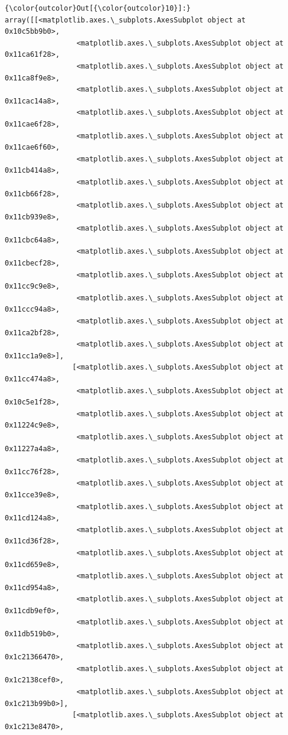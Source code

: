 \documentclass[11pt]{article}
\begin{document}
\begin{Verbatim}[commandchars=\\\{\}]
{\color{outcolor}Out[{\color{outcolor}10}]:} array([[<matplotlib.axes.\_subplots.AxesSubplot object at 0x10c5bb9b0>,
                 <matplotlib.axes.\_subplots.AxesSubplot object at 0x11ca61f28>,
                 <matplotlib.axes.\_subplots.AxesSubplot object at 0x11ca8f9e8>,
                 <matplotlib.axes.\_subplots.AxesSubplot object at 0x11cac14a8>,
                 <matplotlib.axes.\_subplots.AxesSubplot object at 0x11cae6f28>,
                 <matplotlib.axes.\_subplots.AxesSubplot object at 0x11cae6f60>,
                 <matplotlib.axes.\_subplots.AxesSubplot object at 0x11cb414a8>,
                 <matplotlib.axes.\_subplots.AxesSubplot object at 0x11cb66f28>,
                 <matplotlib.axes.\_subplots.AxesSubplot object at 0x11cb939e8>,
                 <matplotlib.axes.\_subplots.AxesSubplot object at 0x11cbc64a8>,
                 <matplotlib.axes.\_subplots.AxesSubplot object at 0x11cbecf28>,
                 <matplotlib.axes.\_subplots.AxesSubplot object at 0x11cc9c9e8>,
                 <matplotlib.axes.\_subplots.AxesSubplot object at 0x11ccc94a8>,
                 <matplotlib.axes.\_subplots.AxesSubplot object at 0x11ca2bf28>,
                 <matplotlib.axes.\_subplots.AxesSubplot object at 0x11cc1a9e8>],
                [<matplotlib.axes.\_subplots.AxesSubplot object at 0x11cc474a8>,
                 <matplotlib.axes.\_subplots.AxesSubplot object at 0x10c5e1f28>,
                 <matplotlib.axes.\_subplots.AxesSubplot object at 0x11224c9e8>,
                 <matplotlib.axes.\_subplots.AxesSubplot object at 0x11227a4a8>,
                 <matplotlib.axes.\_subplots.AxesSubplot object at 0x11cc76f28>,
                 <matplotlib.axes.\_subplots.AxesSubplot object at 0x11cce39e8>,
                 <matplotlib.axes.\_subplots.AxesSubplot object at 0x11cd124a8>,
                 <matplotlib.axes.\_subplots.AxesSubplot object at 0x11cd36f28>,
                 <matplotlib.axes.\_subplots.AxesSubplot object at 0x11cd659e8>,
                 <matplotlib.axes.\_subplots.AxesSubplot object at 0x11cd954a8>,
                 <matplotlib.axes.\_subplots.AxesSubplot object at 0x11cdb9ef0>,
                 <matplotlib.axes.\_subplots.AxesSubplot object at 0x11db519b0>,
                 <matplotlib.axes.\_subplots.AxesSubplot object at 0x1c21366470>,
                 <matplotlib.axes.\_subplots.AxesSubplot object at 0x1c2138cef0>,
                 <matplotlib.axes.\_subplots.AxesSubplot object at 0x1c213b99b0>],
                [<matplotlib.axes.\_subplots.AxesSubplot object at 0x1c213e8470>,

\end{Verbatim}
\end{document}
